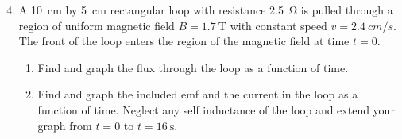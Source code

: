 \documentclass{../../oss-apphys}
\begin{document}
\begin{enumerate}[leftmargin=18pt]

  \setcounter{enumi}{3}
\item A \SI{10}{cm} by \SI{5}{cm} rectangular loop with resistance
  \SI{2.5}{\ohm} is pulled through a region of uniform magnetic field
  $B=\SI{1.7}{\tesla}$ with constant speed $v=\SI{2.4}{cm/s}$. The front of the
  loop enters the region of the magnetic field at time $t=0$.
  \begin{enumerate}[noitemsep,leftmargin=18pt]
  \item Find and graph the flux through the loop as a function of time.
  \item Find and graph the included emf and the current in the loop as a
    function of time. Neglect any self inductance of the loop and extend your
    graph from $t=0$ to $t=\SI{16}{\second}$.
  \end{enumerate}
\end{enumerate}
\end{document}
